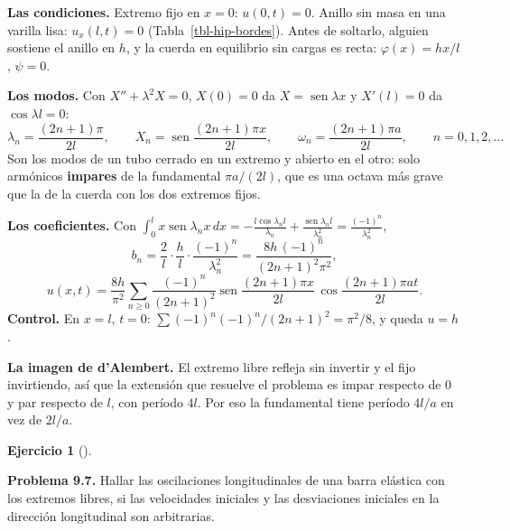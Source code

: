 \documentclass[
  spanish,
  a4paper,
]{scrbook}
\theoremstyle{definition}
\theoremstyle{plain}
\theoremstyle{definition}
\theoremstyle{plain}
\theoremstyle{definition}
\newtheorem{exercise}{Ejercicio}[chapter]
\theoremstyle{remark}
\begin{document}
\begin{tcolorbox}[enhanced jigsaw, arc=.35mm, bottomrule=.15mm, bottomtitle=1mm, breakable, colback=white, colbacktitle=quarto-callout-tip-color!10!white, colframe=quarto-callout-tip-color-frame, coltitle=black, left=2mm, leftrule=.75mm, opacityback=0, opacitybacktitle=0.6, rightrule=.15mm, title=\textcolor{quarto-callout-tip-color}{\faLightbulb}\hspace{0.5em}{Solución}, titlerule=0mm, toprule=.15mm, toptitle=1mm]

\textbf{Las condiciones.} Extremo fijo en \(x = 0\): \(u(0,t) = 0\).
Anillo sin masa en una varilla lisa: \(u_x(l,t) = 0\)
(Tabla~\ref{tbl-hip-bordes}). Antes de soltarlo, alguien sostiene el
anillo en \(h\), y la cuerda en equilibrio sin cargas es recta:
\(\varphi(x) = hx/l\), \(\psi = 0\).

\textbf{Los modos.} Con \(X'' + \lambda^2X = 0\), \(X(0) = 0\) da
\(X = \operatorname{sen}\lambda x\) y \(X'(l) = 0\) da
\(\cos\lambda l = 0\): \[
\lambda_n = \frac{(2n+1)\pi}{2l},\qquad X_n = \operatorname{sen}\frac{(2n+1)\pi x}{2l},\qquad \omega_n = \frac{(2n+1)\pi a}{2l},\qquad n = 0,1,2,\dots
\] Son los modos de un tubo cerrado en un extremo y abierto en el otro:
solo armónicos \textbf{impares} de la fundamental \(\pi a/(2l)\), que es
una octava más grave que la de la cuerda con los dos extremos fijos.

\textbf{Los coeficientes.} Con
\(\int_0^lx\operatorname{sen}\lambda_nx\,dx = -\frac{l\cos\lambda_nl}{\lambda_n} + \frac{\operatorname{sen}\lambda_nl}{\lambda_n^2} = \frac{(-1)^n}{\lambda_n^2}\),
\[
b_n = \frac2l\cdot\frac hl\cdot\frac{(-1)^n}{\lambda_n^2} = \frac{8h\,(-1)^n}{(2n+1)^2\pi^2},
\] \[
u(x,t) = \frac{8h}{\pi^2}\sum_{n\ge0}\frac{(-1)^n}{(2n+1)^2}\operatorname{sen}\frac{(2n+1)\pi x}{2l}\,\cos\frac{(2n+1)\pi at}{2l}.
\] \textbf{Control.} En \(x = l\), \(t = 0\):
\(\sum(-1)^n(-1)^n/(2n+1)^2 = \pi^2/8\), y queda \(u = h\).

\textbf{La imagen de d'Alembert.} El extremo libre refleja sin invertir
y el fijo invirtiendo, así que la extensión que resuelve el problema es
impar respecto de \(0\) y par respecto de \(l\), con período \(4l\). Por
eso la fundamental tiene período \(4l/a\) en vez de \(2l/a\).

\end{tcolorbox}

\begin{exercise}[]\protect\hypertarget{exr-hip-p7}{}\label{exr-hip-p7}

\textbf{Problema 9.7.} Hallar las oscilaciones longitudinales de una
barra elástica con los extremos libres, si las velocidades iniciales y
las desviaciones iniciales en la dirección longitudinal son arbitrarias.

\end{exercise}
\end{document}
